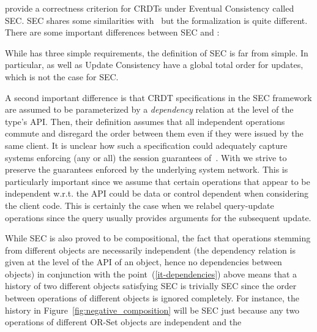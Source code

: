 \citet{JagadeesanR18} provide a correctness criterion for CRDTs under
Eventual Consistency called SEC.
%
SEC shares some similarities with~\cite{PerrinMJ14} but the
formalization is quite different.
There are some important differences between SEC and \CRDTLinshort{}:
\begin{inparaenum}
\item While \CRDTLinshort{} has three simple requirements, the
  definition of SEC is far from simple.
  In particular, \CRDTLinshort{} as well as Update Consistency have a
  global total order for updates, which is not the case for
  SEC. %
\item
  \label{it-dependencies}
  A second important difference is that CRDT
  specifications in the SEC framework are assumed to be parameterized by a \emph{dependency}
  relation at the level of the type's API.
  Then, their definition assumes that all independent operations
  commute %
  and disregard the order between them even if they were issued by the same client.
  It is unclear how such a specification could adequately capture
  systems enforcing (any or all) the session guarantees
  of~\cite{TerryDPSTW94}.
  With \CRDTLinshort{} we strive to preserve the guarantees enforced by the
  underlying system network.
  This is particularly important since we assume that certain
  operations that appear to be independent w.r.t. the API could be
  data or control dependent when considering the client code.
  This is certainly the case when we relabel query-update operations
  since the query usually provides arguments for the subsequent
  update.
\item While SEC is also proved to be compositional, 
  the
  fact that operations stemming from different objects are necessarily
  independent (the dependency relation is given at the level of the API
  of an object, hence no dependencies between objects) in conjunction
  with the point~(\ref{it-dependencies}) above means that a history of 
  two different objects satisfying SEC is trivially SEC since the order between
  operations of different objects is ignored completely. For instance, the
  history in Figure~\ref{fig:negative_composition} will be SEC just because
  any two operations of different OR-Set objects are independent and the

\end{inparaenum}
